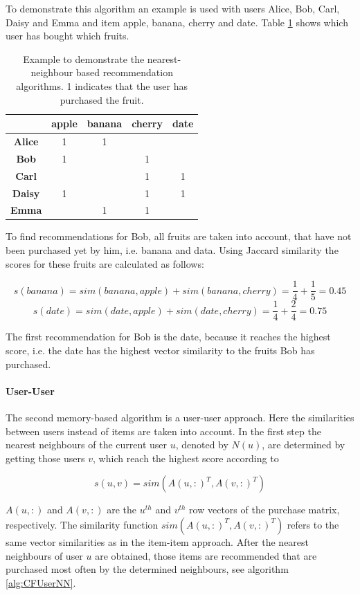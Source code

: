 \documentclass[10pt]{reportMaster}
\begin{document}
To demonstrate this algorithm an example is used with users Alice, Bob, Carl, Daisy and Emma and item apple, banana, cherry and date.
Table \ref{tab:example} shows which user has bought which fruits.
\begin{table}
	\begin{tabular}{|c|c|c|c|c|}
		\hline
		&\textbf{apple}&\textbf{banana}&\textbf{cherry}&\textbf{date}\\ \hline
		\textbf{Alice}&1&1&&\\ \hline
		\textbf{Bob}&1&&1&\\ \hline	
		\textbf{Carl}&&&1&1\\ \hline	
		\textbf{Daisy}&1&&1&1\\ \hline	
		\textbf{Emma}&&1&1&\\ \hline	
	\end{tabular}
	\caption{Example to demonstrate the nearest-neighbour based recommendation algorithms. 1 indicates that the user has purchased the fruit.}	
	\label{tab:example}
\end{table}

To find recommendations for Bob, all fruits are taken into account, that have not been purchased yet by him, i.e. banana and data.
Using Jaccard similarity the scores for these fruits are calculated as follows:

$$s(banana) = sim(banana, apple) + sim(banana, cherry) = \frac{1}{4} + \frac{1}{5} = 0.45$$
$$s(date) = sim(date, apple) + sim(date, cherry) = \frac{1}{4} + \frac{2}{4} = 0.75$$

The first recommendation for Bob is the date, because it reaches the highest score, i.e. the date has the highest vector similarity to the fruits Bob has purchased.


\paragraph{User-User}
The second memory-based algorithm is a user-user approach. %
Here the similarities between users instead of items are taken into account.
In the first step the nearest neighbours of the current user $u$, denoted by $N(u)$, are determined by getting those users $v$, which reach the highest score according to

\begin{equation}
	s(u,v) = sim(A(u,:)^T, A(v, :)^T)
\end{equation}

$A(u,:)$ and $A(v,:)$ are the $u^{th}$ and $v^{th}$ row vectors of the purchase matrix, respectively.
The similarity function $sim(A(u,:)^T, A(v, :)^T)$ refers to the same vector similarities as in the item-item approach.
After the nearest neighbours of user $u$ are obtained, those items are recommended that are purchased most often by the determined neighbours, see algorithm \ref{alg:CFUserNN}.
\end{document}
